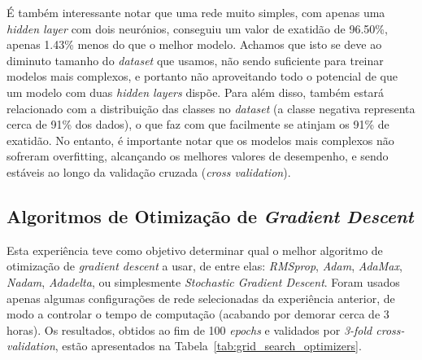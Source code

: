 \documentclass[]{article}
\begin{document}
É também interessante notar que uma rede muito simples, com apenas uma \textit{hidden layer} com dois neurónios, conseguiu um valor de exatidão de 96.50\%, apenas 1.43\% menos do que o melhor modelo.
Achamos que isto se deve ao diminuto tamanho do \textit{dataset} que usamos, não sendo suficiente para treinar modelos mais complexos, e portanto não aproveitando todo o potencial de que um modelo com duas \textit{hidden layers} dispõe. Para além disso, também estará relacionado com a distribuição das classes no \textit{dataset} (a classe negativa representa cerca de 91\% dos dados), o que faz com que facilmente se atinjam os 91\% de exatidão. No entanto, é importante notar que os modelos mais complexos não sofreram overfitting, alcançando os melhores valores de desempenho, e sendo estáveis ao longo da validação cruzada (\textit{cross validation}).


\subsection{Algoritmos de Otimização de \textit{Gradient Descent}}
\label{sec:optimizers}
Esta experiência teve como objetivo determinar qual o melhor algoritmo de otimização de \textit{gradient descent} a usar, de entre elas: \textit{RMSprop}, \textit{Adam}, \textit{AdaMax}, \textit{Nadam}, \textit{Adadelta}, ou simplesmente \textit{Stochastic Gradient Descent}. Foram usados apenas algumas configurações de rede selecionadas da experiência anterior, de modo a controlar o tempo de computação (acabando por demorar cerca de 3 horas). Os resultados, obtidos ao fim de 100 \textit{epochs} e validados por \textit{3-fold cross-validation}, estão apresentados na Tabela~\ref{tab:grid_search_optimizers}.
\end{document}
